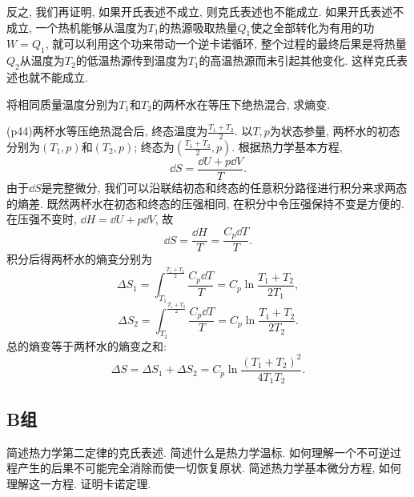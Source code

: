 \begin{questions}
\begin{solution}
    反之, 我们再证明, 如果开氏表述不成立, 则克氏表述也不能成立. 如果开氏表述不成立, 一个热机能够从温度为$T_1$的热源吸取热量$Q_1$使之全部转化为有用的功$W=Q_1$, 就可以利用这个功来带动一个逆卡诺循环, 整个过程的最终后果是将热量$Q_2$从温度为$T_2$的低温热源传到温度为$T_1$的高温热源而未引起其他变化. 这样克氏表述也就不能成立.
  \end{solution}
  \question 将相同质量温度分别为$T_1$和$T_2$的两杯水在等压下绝热混合, 求熵变.
  \begin{solution}
    (p44)两杯水等压绝热混合后, 终态温度为$\frac{T_1+T_2}{2}$. 以$T, p$为状态参量, 两杯水的初态分别为$(T_1, p)$和$(T_2, p)$; 终态为$(\frac{T_1+T_2}{2}, p)$. 根据热力学基本方程,
    \begin{equation}
      \dd S = \frac{\dd U + p\dd V}{T}.
    \end{equation}
    由于$\dd S$是完整微分, 我们可以沿联结初态和终态的任意积分路径进行积分来求两态的熵差. 既然两杯水在初态和终态的压强相同, 在积分中令压强保持不变是方便的. 在压强不变时, $\dd H = \dd U + p\dd V$, 故
    \begin{equation}
      \dd S = \frac{\dd H}{T} = \frac{C_p\dd T}{T}.
    \end{equation}
    积分后得两杯水的熵变分别为
    \begin{equation}
      \Delta S_1 = \int_{T_1}^{\frac{T_1+T_2}{2}}\frac{C_p\dd T}{T} = C_p\ln\frac{T_1+T_2}{2T_1},
    \end{equation}
    \begin{equation}
      \Delta S_2 = \int_{T_2}^{\frac{T_1+T_2}{2}}\frac{C_p\dd T}{T} = C_p\ln\frac{T_1+T_2}{2T_2}.
    \end{equation}
    总的熵变等于两杯水的熵变之和:
    \begin{equation}
      \Delta S = \Delta S_1 + \Delta S_2 = C_p\ln\frac{(T_1+T_2)^2}{4T_1T_2}.
    \end{equation}
  \end{solution}
\end{questions}
\subsection{B组}
\begin{questions}
  \question 简述热力学第二定律的克氏表述.
  \question 简述什么是热力学温标.
  \question 如何理解一个不可逆过程产生的后果不可能完全消除而使一切恢复原状.
  \question 简述热力学基本微分方程, 如何理解这一方程.
  \question 证明卡诺定理.
\end{questions}